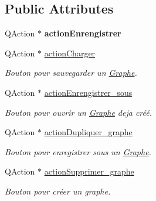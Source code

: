 \subsection*{Public Attributes}
\begin{DoxyCompactItemize}
\item 
\mbox{\label{classUi__MainWindow_a7fb6eff4504e73dda41a384a7726f1b6}} 
Q\+Action $\ast$ {\bfseries action\+Enrengistrer}
\item 
\mbox{\label{classUi__MainWindow_a7bb6d87ced754e8bfc7d1f758253e8fa}} 
Q\+Action $\ast$ \hyperlink{classUi__MainWindow_a7bb6d87ced754e8bfc7d1f758253e8fa}{action\+Charger}
\begin{DoxyCompactList}\small\item\em Bouton pour sauvegarder un \hyperlink{classGraphe}{Graphe}. \end{DoxyCompactList}\item 
\mbox{\label{classUi__MainWindow_a125c7258e678683538e8a13b4bcfd5e1}} 
Q\+Action $\ast$ \hyperlink{classUi__MainWindow_a125c7258e678683538e8a13b4bcfd5e1}{action\+Enrengistrer\+\_\+sous}
\begin{DoxyCompactList}\small\item\em Bouton pour ouvrir un \hyperlink{classGraphe}{Graphe} deja cr\'{e}\'{e}. \end{DoxyCompactList}\item 
\mbox{\label{classUi__MainWindow_a454da46a7f630c671cf6f409bf784346}} 
Q\+Action $\ast$ \hyperlink{classUi__MainWindow_a454da46a7f630c671cf6f409bf784346}{action\+Dupliquer\+\_\+graphe}
\begin{DoxyCompactList}\small\item\em Bouton pour enregistrer sous un \hyperlink{classGraphe}{Graphe}. \end{DoxyCompactList}\item 
\mbox{\label{classUi__MainWindow_a03edd7f163ae4611adeb6a424bc864f9}} 
Q\+Action $\ast$ \hyperlink{classUi__MainWindow_a03edd7f163ae4611adeb6a424bc864f9}{action\+Supprimer\+\_\+graphe}
\begin{DoxyCompactList}\small\item\em Bouton pour cr\'{e}er un graphe. \end{DoxyCompactList}\item 

\end{DoxyCompactItemize}
